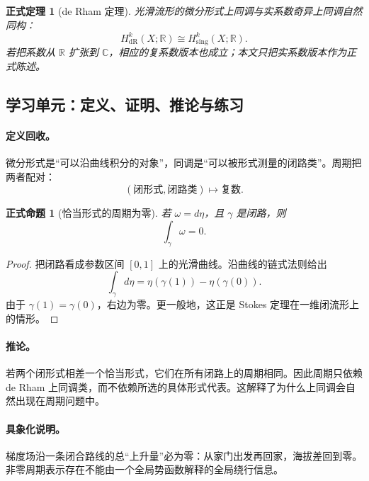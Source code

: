 \documentclass[UTF8,fontset=none,a4paper,11pt]{ctexart}
\theoremstyle{foundation-definition}
\theoremstyle{foundation-theorem}
\newtheorem{theorem}[definition]{正式定理}
\theoremstyle{foundation-proposition}
\newtheorem{proposition}[definition]{正式命题}
\theoremstyle{foundation-example}
\theoremstyle{foundation-remark}
\theoremstyle{foundation-theorem}
\begin{document}
\begin{theorem}[de Rham 定理]
光滑流形的微分形式上同调与实系数奇异上同调自然同构：
\[
H^k_{\mathrm{dR}}(X;\mathbb R)\cong H^k_{\mathrm{sing}}(X;\mathbb R).
\]
若把系数从 \(\mathbb R\) 扩张到 \(\mathbb C\)，相应的复系数版本也成立；本文只把实系数版本作为正式陈述。
\end{theorem}

\subsection{学习单元：定义、证明、推论与练习}

\paragraph{定义回收。}
微分形式是“可以沿曲线积分的对象”，同调是“可以被形式测量的闭路类”。周期把两者配对：
\[
(\text{闭形式},\text{闭路类})\longmapsto\text{复数}.
\]

\begin{proposition}[恰当形式的周期为零]\label{prop:exact-period-zero}
若 \(\omega=d\eta\)，且 \(\gamma\) 是闭路，则
\[
\int_\gamma\omega=0.
\]
\end{proposition}

\begin{proof}
把闭路看成参数区间 \([0,1]\) 上的光滑曲线。沿曲线的链式法则给出
\[
\int_\gamma d\eta
=\eta(\gamma(1))-\eta(\gamma(0)).
\]
由于 \(\gamma(1)=\gamma(0)\)，右边为零。更一般地，这正是 Stokes 定理在一维闭流形上的情形。
\end{proof}

\paragraph{推论。}
若两个闭形式相差一个恰当形式，它们在所有闭路上的周期相同。因此周期只依赖 de Rham 上同调类，而不依赖所选的具体形式代表。这解释了为什么上同调会自然出现在周期问题中。

\paragraph{具象化说明。}
梯度场沿一条闭合路线的总“上升量”必为零：从家门出发再回家，海拔差回到零。非零周期表示存在不能由一个全局势函数解释的全局绕行信息。
\end{document}
